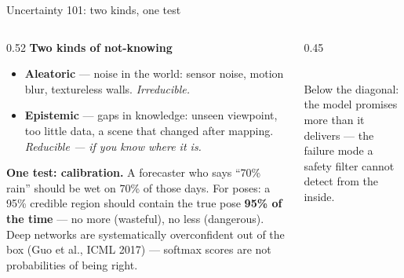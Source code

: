 \documentclass[aspectratio=169,10pt]{beamer}
\newcommand{\srcnote}[1]{{\tiny\color{ink!55}#1}}
\newcommand{\bad}[1]{{\color{uHigh}#1}}
\begin{document}
\begin{frame}{Uncertainty 101: two kinds, one test}
  \begin{columns}[T]
    \begin{column}{0.52\textwidth}
      \textbf{Two kinds of not-knowing}
      \begin{itemize}
        \item \textbf{Aleatoric} --- noise in the world: sensor noise,
              motion blur, textureless walls. \emph{Irreducible.}
        \item \textbf{Epistemic} --- gaps in knowledge: unseen viewpoint,
              too little data, \alert{a scene that changed after mapping}.
              \emph{Reducible --- if you know where it is.}
      \end{itemize}
      \vspace{1mm}
      \textbf{One test: calibration.}
      A forecaster who says ``70\% rain'' should be wet on 70\% of those
      days. For poses: a 95\% credible region should contain the true pose
      \textbf{95\% of the time} --- no more (wasteful), no less
      (\bad{dangerous}).
      \vspace{1mm}
      \srcnote{Deep networks are systematically overconfident out of the box
      (Guo et al., ICML 2017) --- softmax scores are not probabilities of
      being right.}
    \end{column}
    \begin{column}{0.45\textwidth}
      \centering
      \\[2mm]
      \small Below the diagonal: the model promises more than it delivers
      --- the failure mode a safety filter cannot detect from the inside.
    \end{column}
  \end{columns}
\end{frame}
\end{document}
